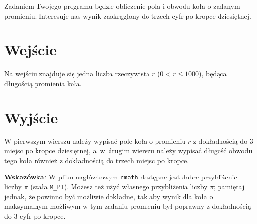\documentclass{spiral-kurs}
\begin{document}
\makeheader
%
  Zadaniem Twojego programu będzie obliczenie pola i obwodu
  koła o zadanym promieniu.
  Interesuje nas wynik zaokrąglony do trzech cyfr po kropce dziesiętnej.

  \section{Wejście}
  Na wejściu znajduje się jedna liczba rzeczywista $r$
  ($0 < r \le 1000$), będąca długością promienia koła.

  \section{Wyjście}
  W pierwszym wierszu należy wypisać pole koła o promieniu 
  $r$ z dokładnością do 3 miejsc po kropce dziesiętnej, a~w~drugim wierszu należy wypisać długość obwodu tego koła również 
  z dokładnością do trzech miejsc po kropce.
                  

  \medskip
  \noindent
  \textbf{Wskazówka:} W pliku nagłówkowym \texttt{cmath} dostępne jest dobre przybliżenie
  liczby $\pi$ (stała \texttt{M\_PI}).
  Możesz też użyć własnego przybliżenia liczby $\pi$; pamiętaj jednak, że powinno być możliwie dokładne, tak
  aby wynik dla koła o maksymalnym możliwym w tym zadaniu promieniu był poprawny z dokładnością do 3 cyfr po kropce.


  
\end{document}
